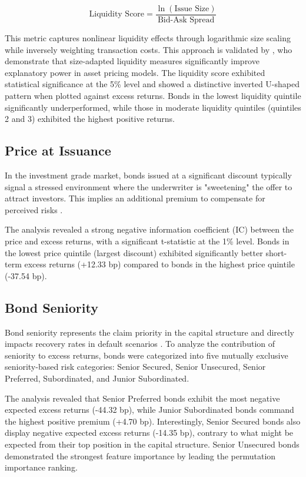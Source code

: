 $$\text{Liquidity Score} = \frac{\ln(\text{Issue Size})}{\text{Bid-Ask Spread}}$$

This metric captures nonlinear liquidity effects through logarithmic size scaling while inversely weighting transaction costs. This approach is validated by \textcite{Reichenbacher2018Size-AdaptedImplications}, who demonstrate that size-adapted liquidity measures significantly improve explanatory power in asset pricing models. The liquidity score exhibited statistical significance at the 5\% level and showed a distinctive inverted U-shaped pattern when plotted against excess returns. Bonds in the lowest liquidity quintile significantly underperformed, while those in moderate liquidity quintiles (quintiles 2 and 3) exhibited the highest positive returns.

\subsection{Price at Issuance}
In the investment grade market, bonds issued at a significant discount typically signal a stressed environment where the underwriter is "sweetening" the offer to attract investors. This implies an additional premium to compensate for perceived risks \parencite{Geerts2022PredictingYield}.

The analysis revealed a strong negative information coefficient (IC) between the price and excess returns, with a significant t-statistic at the 1\% level. Bonds in the lowest price quintile (largest discount) exhibited significantly better short-term excess returns (+12.33 bp) compared to bonds in the highest price quintile (-37.54 bp).

\subsection{Bond Seniority}
Bond seniority represents the claim priority in the capital structure and directly impacts recovery rates in default scenarios \parencite[pp. 682 - 683]{Fabozzi2021TheEdition}. To analyze the contribution of seniority to excess returns, bonds were categorized into five mutually exclusive seniority-based risk categories: Senior Secured, Senior Unsecured, Senior Preferred, Subordinated, and Junior Subordinated.

The analysis revealed that Senior Preferred bonds exhibit the most negative expected excess returns (-44.32 bp), while Junior Subordinated bonds command the highest positive premium (+4.70 bp). Interestingly, Senior Secured bonds also display negative expected excess returns (-14.35 bp), contrary to what might be expected from their top position in the capital structure. Senior Unsecured bonds demonstrated the strongest feature importance by leading the permutation importance ranking.

